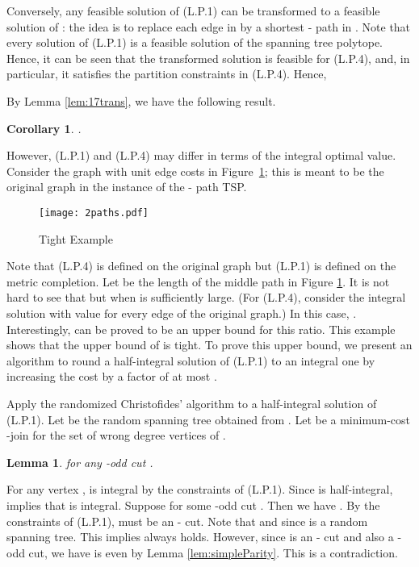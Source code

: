 \documentclass[11pt]{article}
\newcommand{\qed}{\hspace*{\fill}}
\newtheorem{lemma}[theorem]{Lemma}
\newtheorem{corollary}[theorem]{Corollary}
\newenvironment{proof}[1][Proof. ]{\noindent {\bf #1 }}{\qed}
\begin{document}
Conversely, any feasible solution of (L.P.1) can be transformed to
a feasible solution of :
the idea is to replace each edge  in 
by a shortest - path in .
Note that every solution of (L.P.1) is a feasible solution of
the spanning tree polytope. Hence,
it can be seen that the transformed solution is feasible for (L.P.4),
and, in particular, it satisfies the partition constraints in (L.P.4).
Hence,
 

By Lemma \ref{lem:17trans}, we have the following result.

\begin{corollary}\label{cor:equiv}
.
\end{corollary}

However, (L.P.1) and (L.P.4) may differ
in terms of the integral optimal value.
Consider the graph with unit edge costs in Figure~\ref{tightExample};
this is meant to be the original graph  in the instance
of the - path TSP.

\begin{figure}[h]
\begin{center}
\texttt{[image: 2paths.pdf]}\\
  \caption{Tight Example}
  \label{tightExample}
\end{center}
\end{figure}

Note that (L.P.4) is defined on the original graph but (L.P.1) is
defined on the metric completion. Let  be the length of the
middle path in Figure \ref{tightExample}. It is not hard to see
that  but  when  is sufficiently large. (For (L.P.4), consider the integral solution with value  for
every edge of the original graph.) In this case,
.
Interestingly,  can be proved to be an upper bound for this
ratio. This example shows that the upper bound of  is tight. To prove this upper bound, we present an algorithm to round a half-integral solution of (L.P.1) to an integral one by increasing the cost by a factor of at most .

Apply the randomized Christofides' algorithm to a half-integral
solution  of (L.P.1). Let  be the random spanning tree obtained
from . Let  be a minimum-cost -join for the set of wrong degree
vertices  of .

\begin{lemma}\label{lem:fea-half}
 for any  -odd cut .
\end{lemma}
\begin{proof}
For any vertex ,  is integral by
the constraints of (L.P.1).
Since  is half-integral,  implies that  is integral.
Suppose  for some -odd cut . Then we have
. By the constraints of (L.P.1),  must be an
- cut. Note that  and  since  is a random spanning tree. This implies  always holds. However, since  is an - cut and
also a -odd cut, we have  is even by Lemma \ref{lem:simpleParity}. This is a contradiction.
\end{proof}
\end{document}
